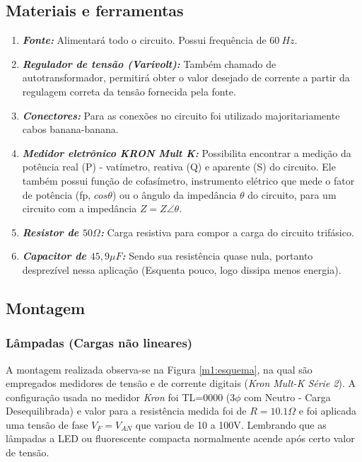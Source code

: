 \documentclass[a4paper,12pt,oneside,openany,table,xcdraw]{article}
\begin{document}
\subsection{Materiais e ferramentas} %
\begin{enumerate}[1 -]
\item \emph{\textbf{Fonte:}}
Alimentará todo o circuito. Possui frequência de $60\ Hz$.

\item \emph{\textbf{Regulador de tensão (Varivolt):}}
Também chamado de autotransformador, permitirá obter o valor desejado de corrente a partir da regulagem correta da tensão fornecida pela fonte.

\item \emph{\textbf{Conectores:}}
Para as conexões no circuito foi utilizado majoritariamente cabos banana-banana.

\item \emph{\textbf{Medidor eletrônico KRON Mult K:}}
Possibilita encontrar a medição da potência real (P) - vatímetro, reativa (Q) e aparente (S) do circuito. Ele também possui função de cofasímetro, instrumento elétrico que mede o fator de potência (fp, $cos\theta$) ou o ângulo da impedância $\theta$ do circuito, para um circuito com a impedância $Z = Z\angle \theta$.

\item \emph{\textbf{Resistor de $50\Omega$:}}
Carga resistiva para compor a carga do circuito trifásico.

\item \emph{\textbf{Capacitor de $45,9\mu F$:}}
Sendo sua resistência quase nula, portanto desprezível nessa aplicação (Esquenta pouco, logo dissipa menos energia).
\end{enumerate}

\vspace{0.2cm}
\subsection{Montagem} %

\subsubsection{Lâmpadas (Cargas não lineares)}
A montagem realizada observa-se na Figura \ref{m1:esquema}, na qual são empregados medidores de tensão e de corrente digitais (\emph{Kron Mult-K Série 2}). A configuração usada no medidor \emph{Kron} foi TL=0000 ($3\phi$ com Neutro - Carga Desequilibrada) e valor para a resistência medida foi de $R=10.1\Omega$ e foi aplicada uma tensão de fase $V_F=V_{AN}$ que variou de 10 a 100V. Lembrando que as lâmpadas a LED ou fluorescente compacta normalmente acende após certo valor de tensão.
\end{document}
